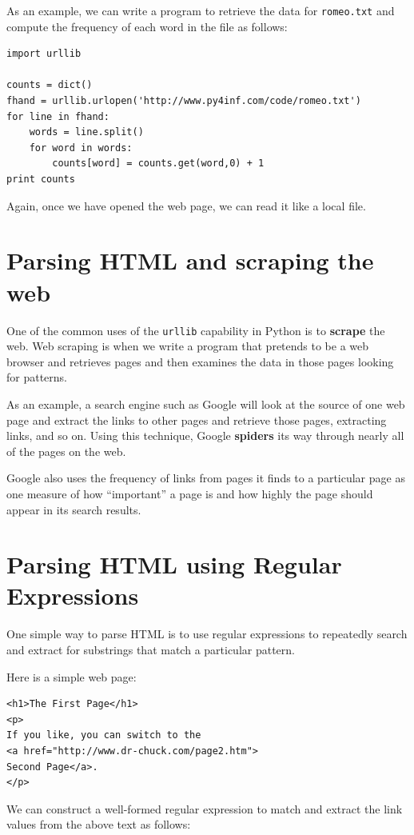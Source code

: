 \documentclass[11pt]{book}
\begin{document}
As an example, we can write 
a program to retrieve the data for
{\tt romeo.txt} and compute the frequency
of each word in the file as follows:

\beforeverb
\begin{verbatim}
import urllib

counts = dict()
fhand = urllib.urlopen('http://www.py4inf.com/code/romeo.txt')
for line in fhand:
    words = line.split()
    for word in words:
        counts[word] = counts.get(word,0) + 1   
print counts
\end{verbatim}
\afterverb
%
Again, once we have opened the web page, 
we can read it like a local file.

\section{Parsing HTML and scraping the web}

One of the common uses of the {\tt urllib} capability in Python is 
to {\bf scrape} the web.   Web scraping is when we write a program
that pretends to be a web browser and retrieves pages and then 
examines the data in those pages looking for patterns.

As an example, a search engine such as Google will look at the source 
of one web page and extract the links to other pages and retrieve
those pages, extracting links, and so on.   Using this technique,
Google {\bf spiders} its way through nearly all of the pages on 
the web.   

Google also uses the frequency of links from pages it finds 
to a particular page as one measure of how ``important'' 
a page is and how highly the page should appear in its search results.

\section{Parsing HTML using Regular Expressions}

One simple way to parse HTML is to use regular expressions to repeatedly
search and extract for substrings that match a particular pattern.

Here is a simple web page:

\beforeverb
\begin{verbatim}
<h1>The First Page</h1>
<p>
If you like, you can switch to the
<a href="http://www.dr-chuck.com/page2.htm">
Second Page</a>.
</p>
\end{verbatim}
\afterverb
%
We can construct a well-formed regular expression to match
and extract the link values from the above text as follows:
\end{document}
